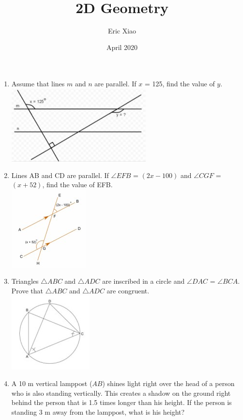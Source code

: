 \documentclass[12pt]{extarticle}
\title{2D Geometry}
\author{Eric Xiao}
\date{April 2020}
\begin{document}
\maketitle

\begin{enumerate}
    \item {Assume that lines $m$ and $n$ are parallel. If \angle $x$ = {125\textdegree}, find the value of \angle $y$.\\
    \includegraphics{April_25_Q1.jpg}}
    \item {Lines AB and CD are parallel. If $\angle EFB$ = {$(2x-100)$\textdegree} and $\angle CGF$ = {$(x+52)$\textdegree}, find the value of \angle EFB.\\
    \includegraphics{April_25_Q2.jpg}}
    \item {Triangles $\bigtriangleup ABC$ and $\bigtriangleup ADC$ are inscribed in a circle and $\angle DAC$ = $\angle BCA$. Prove that $\bigtriangleup ABC$ and $\bigtriangleup ADC$ are congruent.\\
    \includegraphics{April_25_Q3.jpg}}
    \item {A 10 m vertical lamppost ($AB$) shines light right over the head of a person who is also standing vertically. This creates a shadow on the ground right behind the person that is 1.5 times longer than his height. If the person is standing 3 m away from the lamppost, what is his height?\\
}
\end{enumerate}
\end{document}
